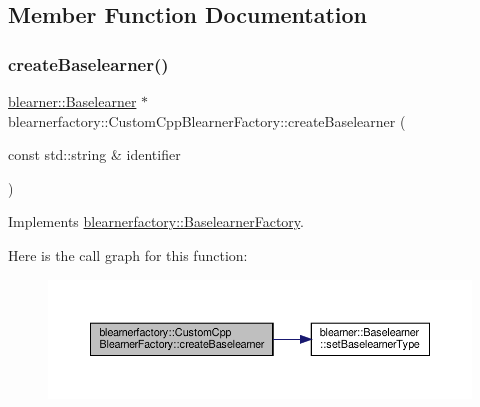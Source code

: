 \subsection{Member Function Documentation}
\mbox{\label{classblearnerfactory_1_1_custom_cpp_blearner_factory_ac98fae043e6822605261c7c6f7125e8c}} 
\subsubsection{\texorpdfstring{create\+Baselearner()}{createBaselearner()}}
{\footnotesize\ttfamily \hyperlink{classblearner_1_1_baselearner}{blearner\+::\+Baselearner} $\ast$ blearnerfactory\+::\+Custom\+Cpp\+Blearner\+Factory\+::create\+Baselearner (\begin{DoxyParamCaption}\item[{const std\+::string \&}]{identifier }\end{DoxyParamCaption})\hspace{0.3cm}{\ttfamily [virtual]}}



Implements \hyperlink{classblearnerfactory_1_1_baselearner_factory_ac3584a20a84834099a15908690b837bb}{blearnerfactory\+::\+Baselearner\+Factory}.

Here is the call graph for this function\+:
\nopagebreak
\begin{figure}[H]
\begin{center}
\leavevmode
\includegraphics[width=350pt]{classblearnerfactory_1_1_custom_cpp_blearner_factory_ac98fae043e6822605261c7c6f7125e8c_cgraph}
\end{center}
\end{figure}
\mbox{\label{classblearnerfactory_1_1_custom_cpp_blearner_factory_a29cc0d142660d6e52245c264f71dd651}} 

